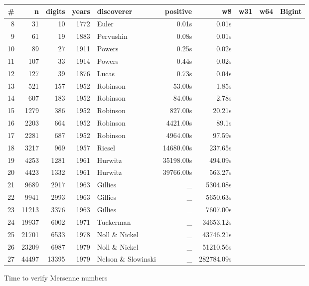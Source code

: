    
\begin{figure}[ht]
\begin{center}
\begin{tabular}{|r|r|r|r|l|r|r|r|r|r |}
\hline
\# & n & digits & years &  discoverer &  positive & w8 & w31 & w64 & Bigint\\
\hline
 8 &   31 &  10 & 1772 & Euler      & 0.01s & 0.01s \\
 9 &   61 &  19 & 1883 & Pervushin  & 0.08s & 0.01s \\
10 &   89 &  27 & 1911 & Powers    & 0.25s & 0.02s \\
11 &  107 &  33 & 1914 & Powers    &  0.44s & 0.02s\\
12 &  127 &  39 & 1876 & Lucas     & 0.73s & 0.04s \\
13 &  521 & 157 & 1952 & Robinson  & 53.00s & 1.85s\\
14 &  607 & 183 & 1952 & Robinson  & 84.00s & 2.78s\\
15 & 1279 & 386 & 1952 & Robinson   & 827.00s & 20.21s\\
16 & 2203 & 664 & 1952 & Robinson  & 4421.00s & 89.1s\\
17 & 2281 & 687 & 1952 & Robinson  & 4964.00s & 97.59s\\
18 & 3217 & 969 & 1957 & Riesel    & 14680.00s & 237.65s\\
19 & 4253 & 1281 & 1961 & Hurwitz & 35198.00s & 494.09s\\
20 & 4423 & 1332 & 1961 & Hurwitz & 39766.00s & 563.27s \\
21 & 9689 & 2917  & 1963 & Gillies & \_ & 5304.08s \\	 
22 & 9941 & 2993  & 1963 & Gillies & \_ & 5650.63s \\	 
23 & 11213 & 3376 & 1963 & Gillies &  \_ & 7607.00s \\ 
24 & 19937 & 6002  & 1971 & Tuckerman& \_ & 34653.12s\\
25 & 21701 & 6533 & 1978 & Noll \& Nickel & \_ &43746.21s\\
26 & 23209 & 6987 & 1979 & Noll \&	Nickel & \_ &51210.56s\\
27 & 44497 & 13395 & 1979 & Nelson \& Slowinski & \_ &282784.09s\\
\hline

\end{tabular}
\end{center}
\caption{Time to verify Mersenne numbers}
\label{fig:Mersenne}
\end{figure}
